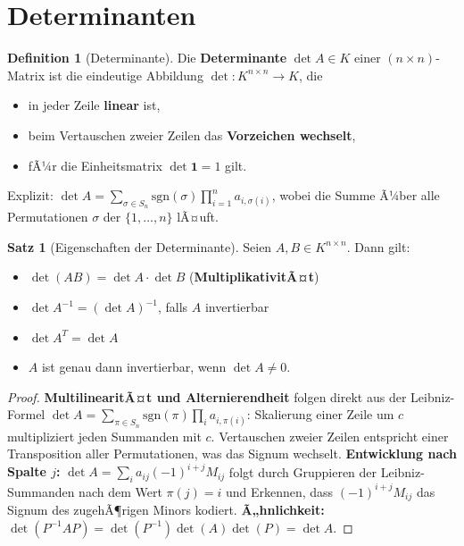 ﻿\documentclass[a4paper,12pt]{report}
\theoremstyle{definition}
\newtheorem{definition}{Definition}
\newtheorem{satz}{Satz}
\begin{document}
\section{Determinanten}

\begin{definition}[Determinante]
    Die \textbf{Determinante} $\det A \in K$ einer $(n \times n)$-Matrix
    ist die eindeutige Abbildung $\det : K^{n \times n} \to K$, die
    \begin{itemize}
        \item[-] in jeder Zeile \textbf{linear} ist,
        \item[-] beim Vertauschen zweier Zeilen das \textbf{Vorzeichen wechselt},
        \item[-] fÃ¼r die Einheitsmatrix $\det \mathbf{1} = 1$ gilt.
    \end{itemize}
    Explizit: $\det A = \sum_{\sigma \in S_n} \mathrm{sgn}(\sigma) \prod_{i=1}^n a_{i,\sigma(i)}$,
    wobei die Summe Ã¼ber alle Permutationen $\sigma$ der $\{1, \dots, n\}$ lÃ¤uft.
\end{definition}

\begin{satz}[Eigenschaften der Determinante]
    Seien $A, B \in K^{n \times n}$. Dann gilt:
    \begin{itemize}
        \item[-] $\det(AB) = \det A \cdot \det B$ \quad (\textbf{MultiplikativitÃ¤t})
        \item[-] $\det A^{-1} = (\det A)^{-1}$, falls $A$ invertierbar
        \item[-] $\det A^T = \det A$
        \item[-] $A$ ist genau dann invertierbar, wenn $\det A \neq 0$.
    \end{itemize}
\end{satz}
\begin{proof}
    \textbf{MultilinearitÃ¤t und Alternierendheit} folgen direkt aus der Leibniz-Formel
    $\det A = \sum_{\pi \in S_n} \mathrm{sgn}(\pi) \prod_i a_{i,\pi(i)}$:
    Skalierung einer Zeile um $c$ multipliziert jeden Summanden mit $c$.
    Vertauschen zweier Zeilen entspricht einer Transposition aller Permutationen,
    was das Signum wechselt.
    \textbf{Entwicklung nach Spalte $j$:} $\det A = \sum_i a_{ij} (-1)^{i+j} M_{ij}$
    folgt durch Gruppieren der Leibniz-Summanden nach dem Wert $\pi(j) = i$
    und Erkennen, dass $(-1)^{i+j} M_{ij}$ das Signum des zugehÃ¶rigen Minors kodiert.
    \textbf{Ã„hnlichkeit:} $\det(P^{-1}AP) = \det(P^{-1})\det(A)\det(P) = \det A$.
\end{proof}
\end{document}
